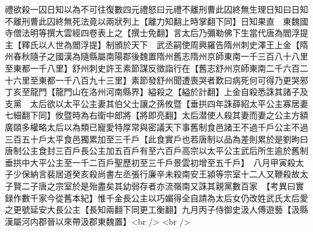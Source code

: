 禮欲殺一囚日知以為不可往復數四元禮怒曰元禮不離刑曹此囚終無生理日知曰日知不離刑曹此囚終無死法竟以兩狀列上【離力知翻上時掌翻下同】日知果直　東魏國寺僧法明等撰大雲經四卷表上之【撰士免翻】言太后乃彌勒佛下生當代唐為閻浮提主【釋氏以人世為閻浮提】制頒於天下　武丞嗣使周興羅告隋州刺史澤王上金【隋州春秋隨子之國漢為隨縣屬南陽郡後魏置隋州舊志隋州京師東南一千三百八十八里至東都一千八里】舒州刺史許王素節謀反徵詣行在【舊志舒州京師東南二千六百二十六里至東都一千八百九十三里】素節發舒州聞遭喪哭者歎曰病死何可得乃更哭邪丁亥至龍門【龍門山在洛州河南縣界】縊殺之【縊於計翻】上金自殺悉誅其諸子及支黨　太后欲以太平公主妻其伯父士讓之孫攸暨【垂拱四年誅薛紹太平公主寡居妻七細翻下同】攸暨時為右衛中郎將【將即亮翻】太后潜使人殺其妻而妻之公主方額廣頤多權略太后以為類已寵愛特厚常與密議天下事舊制食邑諸王不過千戶公主不過三百五十戶太平食邑獨累加至三千戶【此食實戶也若唐制以品為差則累於是劉昫曰唐制公主食封三百戶長公主加五百戶有至六百戶高宗以太平公主武后所生逾於舊制垂拱中大平公主至一千二百戶聖歷初至三千戶景雲初增至五千戶】　八月甲寅殺太子少保納言裴居道癸亥殺尚書左丞張行廉辛未殺南安王潁等宗室十二人又鞭殺故太子賢二子唐之宗室於是殆盡矣其幼弱存者亦流嶺南又誅其親黨數百家　【考異曰實録作數千家今從舊本紀】惟千金長公主以巧媚得全自請為太后女仍改姓武氏太后愛之更號延安大長公主【長知兩翻下同更工衡翻】九月丙子侍御史汲人傅遊藝【汲縣漢屬河内郡晉以來帶汲郡東魏置】<br />
<br />
